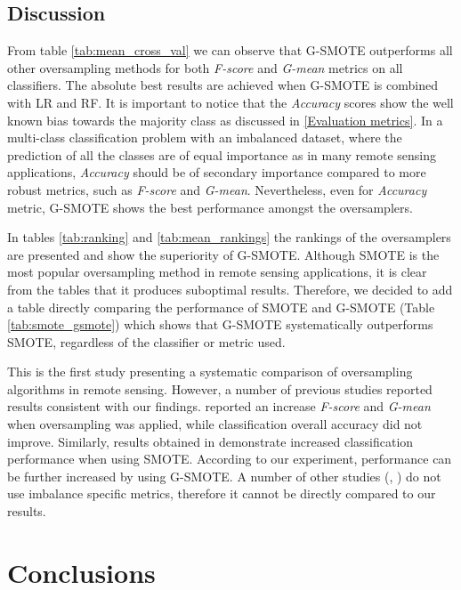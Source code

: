 \documentclass[remotesensing,article,submit,moreauthors,pdftex]{Definitions/mdpi}
\begin{document}
\subsection{Discussion}

From table \ref{tab:mean_cross_val} we can observe that G-SMOTE outperforms all
other oversampling methods for both \textit{F-score} and \textit{G-mean} metrics
on all classifiers. The absolute best results are achieved when G-SMOTE is
combined with LR and RF. It is important to notice that the \textit{Accuracy}
scores show the well known bias towards the majority class as discussed in
\ref{Evaluation metrics}. In a multi-class classification problem with an
imbalanced dataset, where the prediction of all the classes are of equal
importance as in many remote sensing applications, \textit{Accuracy} should be
of secondary importance compared to more robust metrics, such as \textit{F-score} 
and \textit{G-mean}. Nevertheless, even for \textit{Accuracy} metric, 
G-SMOTE shows the best performance amongst the oversamplers.

In tables \ref{tab:ranking} and \ref{tab:mean_rankings} the rankings of the 
oversamplers are presented and show the superiority of G-SMOTE. Although SMOTE 
is the most popular oversampling method in remote sensing applications, it is 
clear from the tables that it produces suboptimal results. Therefore, we decided 
to add a table directly comparing the performance of SMOTE and G-SMOTE 
(Table \ref{tab:smote_gsmote}) which shows that G-SMOTE systematically 
outperforms SMOTE, regardless of the classifier or metric used.

This is the first study presenting a systematic comparison of oversampling 
algorithms in remote sensing. However, a number of previous studies 
reported results consistent with our findings. \cite{Bogner2018} reported 
an increase \textit{F-score} and \textit{G-mean} when oversampling was applied, 
while classification overall accuracy did not improve. Similarly, results 
obtained in \cite{Feng2019} demonstrate increased classification performance 
when using SMOTE. According to our experiment, performance can be further 
increased by using G-SMOTE. A number of other studies (\cite{Cenggoro2018}, \cite{Maxwell2018}) 
do not use imbalance specific metrics, therefore it cannot be directly 
compared to our results.

\section{Conclusions}
\end{document}
